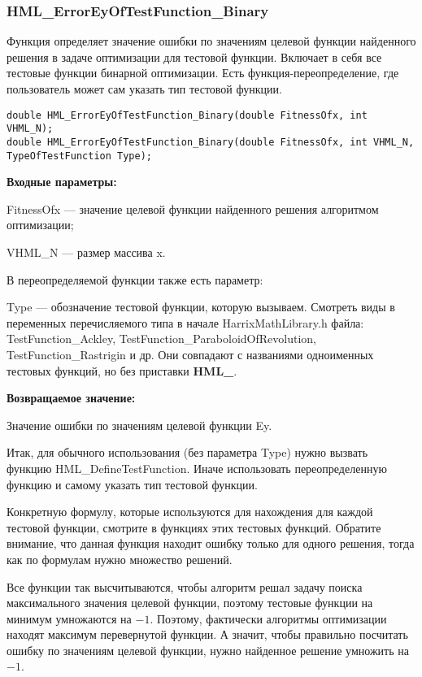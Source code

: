 \documentclass[a4paper,12pt]{article}
\begin{document}
\subsubsection{HML\_ErrorEyOfTestFunction\_Binary}\label{HML_ErrorEyOfTestFunction_Binary}

Функция определяет значение ошибки по значениям целевой функции найденного решения в задаче оптимизации для тестовой функции. Включает в себя все тестовые функции бинарной оптимизации. Есть функция-переопределение, где пользователь может сам указать тип тестовой функции.


\begin{lstlisting}[label=code_syntax_HML_ErrorEyOfTestFunction_Binary,caption=Синтаксис]
double HML_ErrorEyOfTestFunction_Binary(double FitnessOfx, int VHML_N);
double HML_ErrorEyOfTestFunction_Binary(double FitnessOfx, int VHML_N, TypeOfTestFunction Type);
\end{lstlisting}

\textbf{Входные параметры:}

FitnessOfx --- значение целевой функции найденного решения алгоритмом оптимизации;

VHML\_N --- размер массива x.

В переопределяемой функции также есть параметр:
  
Type --- обозначение тестовой функции, которую вызываем.
Смотреть виды в переменных перечисляемого типа в начале HarrixMathLibrary.h файла: TestFunction\_Ackley, TestFunction\_ParaboloidOfRevolution, TestFunction\_Rastrigin и др. Они совпадают с названиями одноименных тестовых функций, но без приставки \textbf{HML\_}.

\textbf{Возвращаемое значение:}
 
Значение ошибки по значениям целевой функции Ey.

Итак, для обычного использования (без параметра Type) нужно вызвать функцию HML\_DefineTestFunction. Иначе использовать переопределенную функцию и самому указать тип тестовой функции.

Конкретную формулу, которые используются для нахождения для каждой тестовой функции, смотрите в функциях этих тестовых функций. Обратите внимание, что данная функция находит ошибку только для одного решения, тогда как по формулам нужно множество решений.

Все функции так высчитываются, чтобы алгоритм решал задачу поиска максимального значения целевой функции, поэтому тестовые функции на минимум умножаются на $-1$. Поэтому, фактически алгоритмы оптимизации находят максимум перевернутой функции. А значит, чтобы правильно посчитать ошибку по значениям целевой функции, нужно найденное решение умножить на $-1$.
\end{document}
